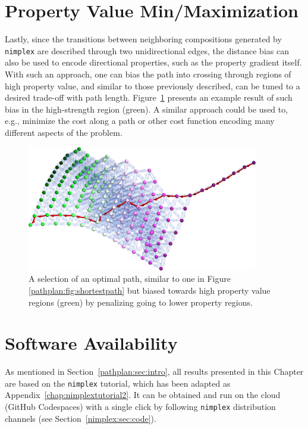 \section{Property Value Min/Maximization} \label{pathplan:sec:minmax}

Lastly, since the transitions between neighboring compositions generated by \texttt{nimplex} are described through two unidirectional edges, the distance bias can also be used to encode directional properties, such as the property gradient itself. With such an approach, one can bias the path into crossing through regions of high property value, and similar to those previously described, can be tuned to a desired trade-off with path length. Figure~\ref{pathplan:fig:highrmsad} presents an example result of such bias in the high-strength region (green). A similar approach could be used to, e.g., minimize the cost along a path or other cost function encoding many different aspects of the problem.

\begin{figure}[H]
    \centering
    \includegraphics[width=0.9\textwidth]{pathplanning/InfeasibilityGliding_HighRMSAD.png}
    \caption{A selection of an optimal path, similar to one in Figure \ref{pathplan:fig:shortestpath} but biased towards high property value regions (green) by penalizing going to lower property regions.}
    \label{pathplan:fig:highrmsad}
\end{figure}

\section{Software Availability} \label{pathplan:sec:softwareavaialbility}

As mentioned in Section~\ref{pathplan:sec:intro}, all results presented in this Chapter are based on the \texttt{nimplex} tutorial, which has been adapted as Appendix~\ref{chap:nimplextutorial2}. It can be obtained and run on the cloud (GitHub Codespaces) with a single click by following \texttt{nimplex} distribution channels (see Section~\ref{nimplex:sec:code}).



\printbibliography[heading=subbibintoc]